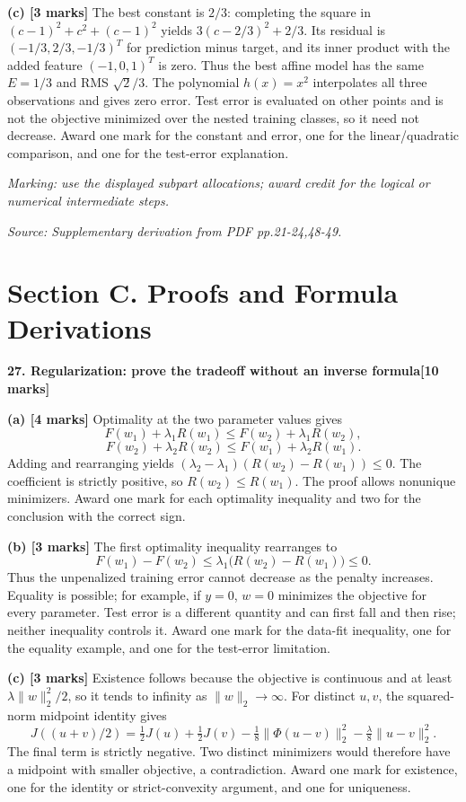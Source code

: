 \documentclass[11pt,a4paper]{article}
\begin{document}
\textbf{(c) [3 marks]} The best constant is \(2/3\): completing the square in \((c-1)^2+c^2+(c-1)^2\) yields \(3(c-2/3)^2+2/3\). Its residual is \((-1/3,2/3,-1/3)^T\) for prediction minus target, and its inner product with the added feature \((-1,0,1)^T\) is zero. Thus the best affine model has the same \(E=1/3\) and RMS \(\sqrt2/3\). The polynomial \(h(x)=x^2\) interpolates all three observations and gives zero error. Test error is evaluated on other points and is not the objective minimized over the nested training classes, so it need not decrease. Award one mark for the constant and error, one for the linear/quadratic comparison, and one for the test-error explanation.

\textit{Marking: use the displayed subpart allocations; award credit for the logical or numerical intermediate steps.}\par
{\footnotesize\textit{Source: Supplementary derivation from PDF pp.21-24,48-49.}}
\newpage\section*{Section C. Proofs and Formula Derivations}
\textbf{27. Regularization: prove the tradeoff without an inverse formula}\hfill\textbf{[10 marks]}\par\medskip
\textbf{(a) [4 marks]} Optimality at the two parameter values gives \[F(w_1)+\lambda_1R(w_1)\leq F(w_2)+\lambda_1R(w_2),\]\[F(w_2)+\lambda_2R(w_2)\leq F(w_1)+\lambda_2R(w_1).\] Adding and rearranging yields \((\lambda_2-\lambda_1)(R(w_2)-R(w_1))\leq0\). The coefficient is strictly positive, so \(R(w_2)\leq R(w_1)\). The proof allows nonunique minimizers. Award one mark for each optimality inequality and two for the conclusion with the correct sign.

\textbf{(b) [3 marks]} The first optimality inequality rearranges to \[F(w_1)-F(w_2)\leq\lambda_1\bigl(R(w_2)-R(w_1)\bigr)\leq0.\] Thus the unpenalized training error cannot decrease as the penalty increases. Equality is possible; for example, if \(y=0\), \(w=0\) minimizes the objective for every parameter. Test error is a different quantity and can first fall and then rise; neither inequality controls it. Award one mark for the data-fit inequality, one for the equality example, and one for the test-error limitation.

\textbf{(c) [3 marks]} Existence follows because the objective is continuous and at least \(\lambda\|w\|_2^2/2\), so it tends to infinity as \(\|w\|_2\to\infty\). For distinct \(u,v\), the squared-norm midpoint identity gives \[J((u+v)/2)=\tfrac12J(u)+\tfrac12J(v)-\tfrac18\|\Phi(u-v)\|_2^2-\tfrac{\lambda}{8}\|u-v\|_2^2.\] The final term is strictly negative. Two distinct minimizers would therefore have a midpoint with smaller objective, a contradiction. Award one mark for existence, one for the identity or strict-convexity argument, and one for uniqueness.
\end{document}
